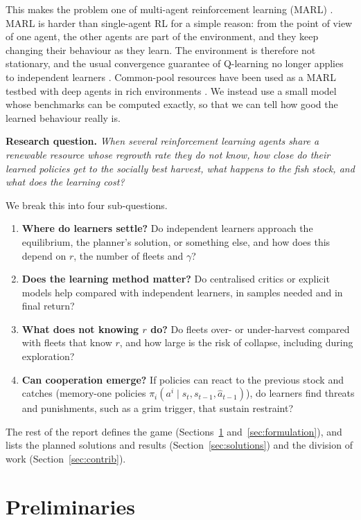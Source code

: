 \documentclass{article}
\begin{document}
This makes the problem one of multi-agent reinforcement learning (MARL) \cite{zhang2021}. MARL is harder than single-agent RL for a simple reason: from the point of view of one agent, the other agents are part of the environment, and they keep changing their behaviour as they learn. The environment is therefore not stationary, and the usual convergence guarantee of Q-learning \cite{watkins1992} no longer applies to independent learners \cite{tan1993}. Common-pool resources have been used as a MARL testbed with deep agents in rich environments \cite{leibo2017,perolat2017}. We instead use a small model whose benchmarks can be computed exactly, so that we can tell how good the learned behaviour really is.

\medskip
\noindent\textbf{Research question.} \textit{When several reinforcement learning agents share a renewable resource whose regrowth rate they do not know, how close do their learned policies get to the socially best harvest, what happens to the fish stock, and what does the learning cost?}
\medskip

We break this into four sub-questions.
\begin{enumerate}
\item \textbf{Where do learners settle?} Do independent learners approach the equilibrium, the planner's solution, or something else, and how does this depend on $r$, the number of fleets and $\gamma$?
\item \textbf{Does the learning method matter?} Do centralised critics or explicit models help compared with independent learners, in samples needed and in final return?
\item \textbf{What does not knowing $r$ do?} Do fleets over- or under-harvest compared with fleets that know $r$, and how large is the risk of collapse, including during exploration?
\item \textbf{Can cooperation emerge?} If policies can react to the previous stock and catches (memory-one policies $\pi_i(a^i\mid s_t,s_{t-1},\hat a_{t-1})$), do learners find threats and punishments, such as a grim trigger, that sustain restraint?
\end{enumerate}

The rest of the report defines the game (Sections~\ref{sec:prelim} and~\ref{sec:formulation}), and lists the planned solutions and results (Section~\ref{sec:solutions}) and the division of work (Section~\ref{sec:contrib}).

\section{Preliminaries}
\label{sec:prelim}
\end{document}
